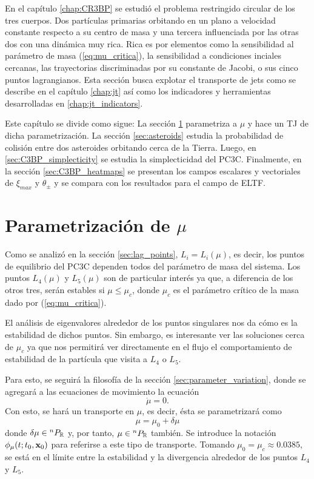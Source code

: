 En el capítulo \ref{chap:CR3BP} se estudió el problema restringido circular de los tres cuerpos. Dos partículas primarias orbitando en un plano a velocidad constante respecto a su centro de masa y una tercera influenciada por las otras dos con una dinámica muy rica. Rica es por elementos como la sensibilidad al parámetro de masa (\ref{eq:mu_critica}), la sensibilidad a condiciones inciales cercanas, las trayectorias discriminadas por su constante de Jacobi, o sus cinco puntos lagrangianos. Esta sección busca explotar el transporte de jets como se describe en el capítulo \ref{chap:jt} así como los indicadores y herramientas desarrolladas en \ref{chap:jt_indicators}.


Este capítulo se divide como sigue: La sección \ref{sec:parametrization} parametriza a $\mu$ y hace un TJ de dicha parametrización. La sección \ref{sec:asteroids} estudia la probabilidad de colisión entre dos asteroides orbitando cerca de la Tierra. Luego, en \ref{sec:C3BP_simplecticity} se estudia la simplecticidad del PC3C. Finalmente, en la sección \ref{sec:C3BP_heatmaps} se presentan los campos escalares y vectoriales de $\xi_{max}$ y $\theta_{\pm}$ y se compara con los resultados para el campo de ELTF.

\section{Parametrización de $\mu$}
\label{sec:parametrization}

Como se analizó en la sección \ref{sec:lag_points}, $L_i = L_i(\mu)$, es decir, los puntos de equilibrio del PC3C dependen todos del parámetro de masa del sistema. Los puntos $L_4(\mu)$ y $L_5(\mu)$ son de particular interés ya que, a diferencia de los otros tres, serán estables si $\mu \leq \mu_c$, donde $\mu_c$ es el parámetro crítico de la masa dado por (\ref{eq:mu_critica}). 

El análisis de eigenvalores alrededor de los puntos singulares nos da cómo es la estabilidad de dichos puntos. Sin embargo, es interesante ver las soluciones cerca de $\mu_c$ ya que nos permitirá ver directamente en el flujo el comportamiento de estabilidad de la partícula que visita a $L_4$ o $L_5$.

Para esto, se seguirá la filosofía de la sección \ref{sec:parameter_variation}, donde se agregará a las ecuaciones de movimiento la ecuación 
\begin{equation*}
 \dot{\mu} = 0.
\end{equation*}
Con esto, se hará un transporte en $\mu$, es decir, ésta se parametrizará como 
\begin{equation*}
 \mu = \mu_0 + \delta\mu
\end{equation*}   
donde $\delta\mu \in {^{n}P_{\mathbb{R}}}$ y, por tanto, $\mu \in {^{n}P_{\mathbb{R}}}$ también. Se introduce la notación $\phi_\mu(t;t_0,\mathbf{x}_0)$ para referirse a este tipo de transporte. Tomando $\mu_0 = \mu_c \approx 0.0385$, se está en el límite entre la estabilidad y la divergencia alrededor de los puntos $L_4$ y $L_5$.

